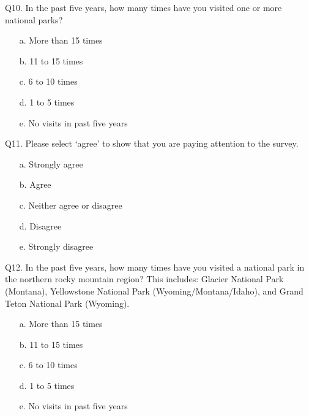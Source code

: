 \documentclass[english,12pt]{article}
\begin{document}
Q10. In the past five years, how many times have you visited one or more national parks?
\begin{enumerate}
    \item[a.] More than 15 times
    \item[b.] 11 to 15 times
    \item[c.] 6 to 10 times
    \item[d.] 1 to 5 times
    \item[e.] No visits in past five years
\end{enumerate}

Q11. Please select `agree' to show that you are paying attention to the survey.
\begin{enumerate}
    \item[a.] Strongly agree
    \item[b.] Agree
    \item[c.] Neither agree or disagree
    \item[d.] Disagree
    \item[e.] Strongly disagree
\end{enumerate}

Q12. In the past five years, how many times have you visited a national park in the northern rocky mountain region? This includes: Glacier National Park (Montana), Yellowstone National Park (Wyoming/Montana/Idaho), and Grand Teton National Park (Wyoming).
\begin{enumerate}
    \item[a.] More than 15 times
    \item[b.] 11 to 15 times
    \item[c.] 6 to 10 times
    \item[d.] 1 to 5 times
    \item[e.] No visits in past five years
\end{enumerate}
\end{document}

